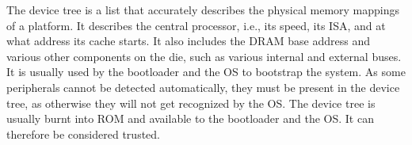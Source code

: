The device tree is a list that accurately describes the physical memory mappings of a platform. It describes the central processor, i.e., its speed, its ISA, and at what address its cache starts. It also includes the DRAM base address and various other components on the die, such as various internal and external buses. It is usually used by the bootloader and the OS to bootstrap the system. As some peripherals cannot be detected automatically, they must be present in the device tree, as otherwise they will not get recognized by the OS. The device tree is usually burnt into ROM and available to the bootloader and the OS. It can therefore be considered trusted.




